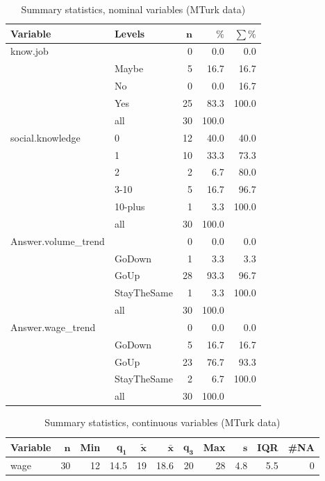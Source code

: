 \documentclass[a4paper,10pt]{article}\usepackage[]{graphicx}\usepackage[]{color}
\begin{document}
\begin{table}[ht]
\centering
{\footnotesize
\begin{tabular}{ll|rrr}
 \textbf{Variable} & \textbf{Levels} & $\mathbf{n}$ & $\mathbf{\%}$ & $\mathbf{\sum \%}$ \\ 
  \hline
know.job &  & 0 & 0.0 & 0.0 \\ 
   & Maybe & 5 & 16.7 & 16.7 \\ 
   & No & 0 & 0.0 & 16.7 \\ 
   & Yes & 25 & 83.3 & 100.0 \\ 
   \hline
 & all & 30 & 100.0 &  \\ 
   \hline
\hline
social.knowledge & 0 & 12 & 40.0 & 40.0 \\ 
   & 1 & 10 & 33.3 & 73.3 \\ 
   & 2 & 2 & 6.7 & 80.0 \\ 
   & 3-10 & 5 & 16.7 & 96.7 \\ 
   & 10-plus & 1 & 3.3 & 100.0 \\ 
   \hline
 & all & 30 & 100.0 &  \\ 
   \hline
\hline
Answer.volume\_trend &  & 0 & 0.0 & 0.0 \\ 
   & GoDown & 1 & 3.3 & 3.3 \\ 
   & GoUp & 28 & 93.3 & 96.7 \\ 
   & StayTheSame & 1 & 3.3 & 100.0 \\ 
   \hline
 & all & 30 & 100.0 &  \\ 
   \hline
\hline
Answer.wage\_trend &  & 0 & 0.0 & 0.0 \\ 
   & GoDown & 5 & 16.7 & 16.7 \\ 
   & GoUp & 23 & 76.7 & 93.3 \\ 
   & StayTheSame & 2 & 6.7 & 100.0 \\ 
   \hline
 & all & 30 & 100.0 &  \\ 
   \hline
\hline
\end{tabular}
}
\caption{Summary statistics, nominal variables (MTurk data)} 
\label{tab1:15-1150}
\end{table}
\begin{table}[ht]
\centering
{\footnotesize
\begin{tabular}{lrrrrrrrrrr}
 \textbf{Variable} & $\mathbf{n}$ & \textbf{Min} & $\mathbf{q_1}$ & $\mathbf{\widetilde{x}}$ & $\mathbf{\bar{x}}$ & $\mathbf{q_3}$ & \textbf{Max} & $\mathbf{s}$ & \textbf{IQR} & \textbf{\#NA} \\ 
  \hline
wage & 30 & 12 & 14.5 & 19 & 18.6 & 20 & 28 & 4.8 & 5.5 & 0 \\ 
  \end{tabular}
}
\caption{Summary statistics, continuous variables (MTurk data)} 
\label{tab2:15-1150}
\end{table}
\end{document}
